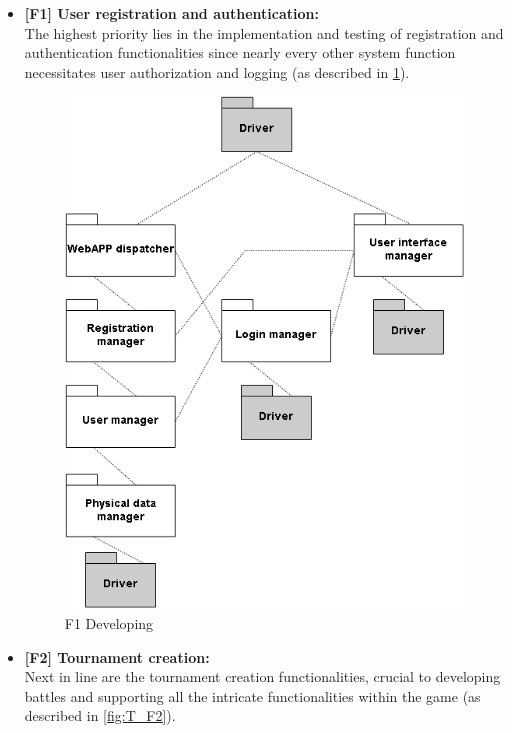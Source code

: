 \begin{itemize}
    \item \textbf{[F1] User registration and authentication:} \\
        The highest priority lies in the implementation and testing of registration and authentication functionalities since nearly every other system function necessitates user authorization and logging (as described in \ref{fig:T_F1}).
        
        \begin{figure}[h!]
            \centering
            \includegraphics[width=\linewidth]{Images/T_F1.png}
            \caption{F1 Developing}
            \label{fig:T_F1}
        \end{figure}

    \item \textbf{[F2] Tournament creation:} \\
        Next in line are the tournament creation functionalities, crucial to developing battles and supporting all the intricate functionalities within the game (as described in \ref{fig:T_F2}).
    

\end{itemize}
